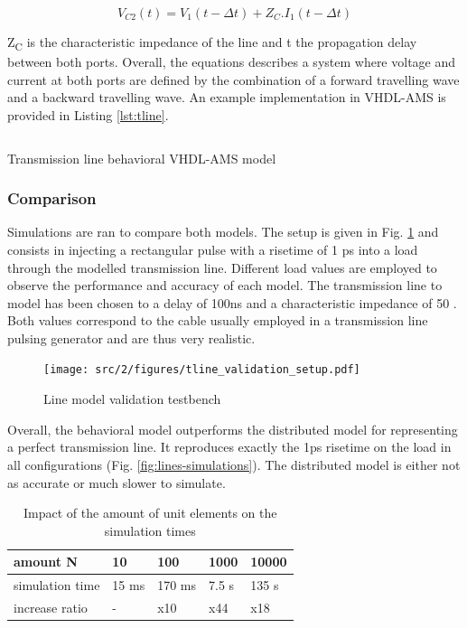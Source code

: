 \begin{equation}
V_{C2}(t) = V_{1}(t - \Delta t) + Z_{C}.I_{1}(t - \Delta t)
\label{eq:beh-line-2}
\end{equation}

Z\textsubscript{C} is the characteristic impedance of the line and \textDelta{}t the propagation delay between both ports.
Overall, the equations describes a system where voltage and current at both ports are defined by the combination of a forward travelling wave and a backward travelling wave.
An example implementation in VHDL-AMS is provided in Listing \ref{lst:tline}.

\begin{code}
\inputminted[frame=single]{VHDL}{src/2/snippets/tline.vhdl}
\caption{Transmission line behavioral VHDL-AMS model}
\label{lst:tline}
\end{code}

\subsubsection{Comparison}

Simulations are ran to compare both models.
The setup is given in Fig. \ref{fig:lines-testbench} and consists in injecting a rectangular pulse with a risetime of 1 ps into a load through the modelled transmission line.
Different load values are employed to observe the performance and accuracy of each model.
The transmission line to model has been chosen to a delay of 100ns and a characteristic impedance of 50 \textOmega.
Both values correspond to the cable usually employed in a transmission line pulsing generator and are thus very realistic.


\begin{figure}[!h]
  \centering
  \texttt{[image: src/2/figures/tline\_validation\_setup.pdf]}
  \caption{Line model validation testbench}
  \label{fig:lines-testbench}
\end{figure}

Overall, the behavioral model outperforms the distributed model for representing a perfect transmission line.
It reproduces exactly the 1ps risetime on the load in all configurations (Fig. \ref{fig:lines-simulations}).
The distributed model is either not as accurate or much slower to simulate.

\begin{table}[!h]
\centering
\begin{tabular}{@{}lllll@{}}
\toprule
amount N         &  10           & 100        &  1000      &   10000    \\ \midrule
simulation time  &  15 ms        & 170 ms     &  7.5 s     &   135 s    \\
increase ratio   &  -            & x10        &  x44       &   x18      \\
\bottomrule
\end{tabular}
\caption{Impact of the amount of unit elements on the simulation times}
\label{tab:tline-impact-simulation-time}
\end{table}

